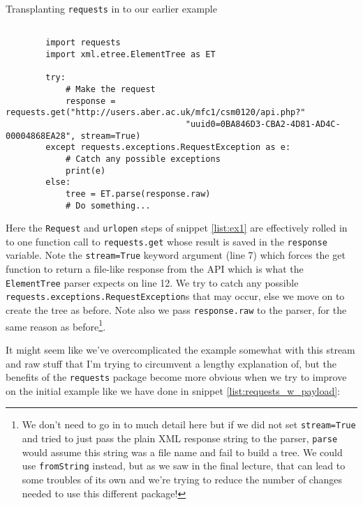 \documentclass[a4paper]{article}
\begin{document}
\begin{listing}[H]
    \caption[]{Transplanting \texttt{requests} in to our earlier example}
    \label{list:requests_101}
    \begin{verbatim}

        import requests
        import xml.etree.ElementTree as ET

        try:
            # Make the request
            response = requests.get("http://users.aber.ac.uk/mfc1/csm0120/api.php?"
                                    "uuid0=0BA846D3-CBA2-4D81-AD4C-00004868EA28", stream=True)
        except requests.exceptions.RequestException as e:
            # Catch any possible exceptions
            print(e)
        else:
            tree = ET.parse(response.raw)
            # Do something...

    \end{verbatim}
\end{listing}

Here the \texttt{Request} and \texttt{urlopen} steps of snippet \ref{list:ex1} are
effectively rolled in to one function call to \texttt{requests.get} whose result
is saved in the \texttt{response} variable. Note the
\texttt{stream=True} keyword argument (line 7) which forces the get function to
return a file-like response from the API which is what the \texttt{ElementTree}
parser expects on line 12. We try to catch any possible \texttt{requests.exceptions.RequestException}s
that may occur, else we move on to create the tree as before. Note also we pass
\texttt{response.raw} to the parser, for the same reason as before\footnote{We don't need
to go in to much detail here but if we did not set \texttt{stream=True} and tried
to just pass the plain XML response string to the parser, \texttt{parse} would assume
this string was a file name and fail to build a tree. We could use \texttt{fromString} instead,
but as we saw in the final lecture, that can lead to some troubles of its own and
we're trying to reduce the number of changes needed to use this different package!}.

It might seem like we've overcomplicated the example somewhat with this stream
and raw stuff that I'm trying to circumvent a lengthy explanation of, but the benefits of
the \texttt{requests} package become more obvious when we try to improve
on the initial example like we have done in snippet \ref{list:requests_w_payload}:
\end{document}
